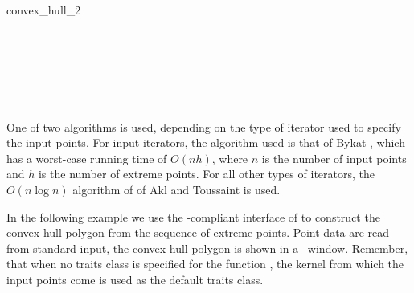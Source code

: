 \begin{ccRefFunction}{convex_hull_2}
\ccSeeAlso

 \\
 \\
 \\
 \\
 \\

\ccImplementation

One of two algorithms is used,
depending on the type of iterator used to specify the input points.  For
input iterators, the algorithm used is that of Bykat \cite{b-chfsp-78}, which 
has a worst-case running time of $O(n h)$, where $n$ is the number of input 
points and $h$ is the number of extreme points.  For all other types of 
iterators, the $O(n \log n)$ algorithm of of Akl and Toussaint 
\cite{at-fcha-78} is used.


\ccExample
In the following example we use the \stl-compliant interface of
 to construct the convex hull polygon from the
sequence of extreme points. Point data are read from standard input, the
convex hull polygon is shown in a \cgal\ window.
Remember, that when no traits class is specified for the function
, the kernel from which the input points come is
used as the default traits class.


\end{ccRefFunction}


